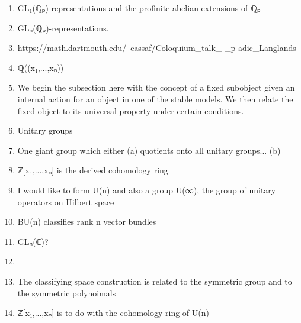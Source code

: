 \documentclass{book}
\begin{document}
\begin{enumerate}
\item GL₁(ℚₚ)-representations and the profinite abelian extensions of ℚₚ
\item GLₙ(ℚₚ)-representations.
\item https://math.dartmouth.edu/~eassaf/Coloquium_talk_-_p-adic_Langlands
\item ℚ((x₁,...,xₙ))
\item We begin the subsection here with the concept of a fixed subobject given an internal action for an object in one of the stable models. We then relate the fixed object to its universal property under certain conditions.
\item Unitary groups
\item One giant group which either (a) quotients onto all unitary groups... (b)
\item ℤ[x₁,...,xₙ] is the derived cohomology ring 
\item I would like to form U(n) and also a group U(∞), the group of unitary operators on Hilbert space
\item BU(n) classifies rank n vector bundles
\item GLₙ(ℂ)?
\item 
\item The classifying space construction is related to the symmetric group and to the symmetric polynoimals
\item ℤ[x₁,...,xₙ] is to do with the cohomology ring of U(n)
\end{enumerate}
\end{document}
